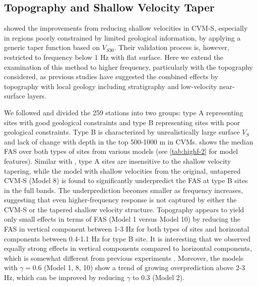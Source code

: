 \subsection{Topography and Shallow Velocity Taper}\label{highf:topoandtaper}
\citet{huCalibrationNearsurfaceSeismic2021} showed the improvements from reducing shallow velocities in CVM-S, especially in regions poorly constrained by limited geological information, by applying a generic taper function based on $V_{S30}$.
Their validation process is, however, restricted to frequency below 1 Hz with flat surface. Here we extend the examination of this method to higher frequency, particularly with the topography considered, as previous studies have suggested the combined effects by topography with local geology including stratigraphy and low-velocity near-surface layers.

We followed \citet{huCalibrationNearsurfaceSeismic2021} and divided the 259 stations into two groups: type A representing sites with good geological constraints and type B representing sites with poor geological constraints. Type B is characterized by unrealistically large surface $V_S$ and lack of change with depth in the top 500-1000 m in CVMs.  shows the median FAS over both types of sites from various models (see \cref{tab:highf-2} for model features). Similar with \citet{huCalibrationNearsurfaceSeismic2021}, type A sites are insensitive to the shallow velocity tapering, while the model with shallow velocities from the original, untapered CVM-S (Model 8) is found to significantly underpredict the FAS at type B sites in the full bands. The underprediction becomes smaller as frequency increases, suggesting that even higher-frequency response is not captured by either the CVM-S or the tapered shallow velocity structure. Topography appears to yield only small effects in terms of FAS (Model 1 versus Model 10) by reducing the FAS in vertical component between 1-3 Hz for both types of sites and horizontal components between 0.4-1.1 Hz for type B site. It is interesting that we observed equally strong effects in vertical components compared to horizontal components, which is somewhat different from previous experiments \citep[][and the references therein]{massaOverviewTopographicEffects2014}. Moreover, the models with $\gamma=0.6$ (Model 1, 8, 10) show a trend of growing overprediction above 2-3 Hz, which can be improved by reducing $\gamma$ to 0.3 (Model 2).



